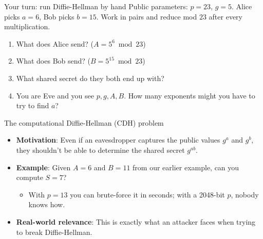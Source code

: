 \ifdefined\PRESENTATION\else\PassOptionsToClass{handout}{beamer}\fi\documentclass[aspectratio=169, lualatex]{beamer}
\begin{document}
\begin{frame}{Your turn: run Diffie-Hellman by hand}
	Public parameters: $p = 23$, $g = 5$. Alice picks $a = 6$, Bob picks $b = 15$. Work in pairs and reduce mod $23$ after every multiplication.
	\begin{enumerate}
		\item What does Alice send? ($A = 5^6 \bmod 23$)
		\item What does Bob send? ($B = 5^{15} \bmod 23$)
		\item What shared secret do they both end up with?
		\item You are Eve and you see $p, g, A, B$. How many exponents might you have to try to find $a$?
	\end{enumerate}
	\pause
	\vspace{0.1cm}
\end{frame}

\begin{frame}{The computational Diffie-Hellman (CDH) problem}
	\begin{itemize}[<+->]
		\item \textbf{Motivation}: Even if an eavesdropper captures the public values $g^a$ and $g^b$, they shouldn't be able to determine the shared secret $g^{ab}$.
		\item \textbf{Example}: Given $A = 6$ and $B = 11$ from our earlier example, can you compute $S = 7$?
		      \begin{itemize}
			      \item With $p = 13$ you can brute-force it in seconds; with a 2048-bit $p$, nobody knows how.
		      \end{itemize}
		\item \textbf{Real-world relevance}: This is exactly what an attacker faces when trying to break Diffie-Hellman.
	\end{itemize}
\end{frame}
\end{document}
